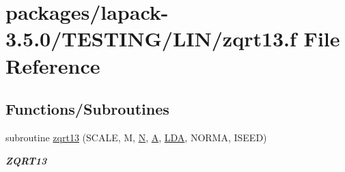 \hypertarget{zqrt13_8f}{}\section{packages/lapack-\/3.5.0/\+T\+E\+S\+T\+I\+N\+G/\+L\+I\+N/zqrt13.f File Reference}
\label{zqrt13_8f}
\subsection*{Functions/\+Subroutines}
\begin{DoxyCompactItemize}
\item 
subroutine \hyperlink{group__complex16__lin_ga951addfdb4cc63d6a52f018e7f86475a}{zqrt13} (S\+C\+A\+L\+E, M, \hyperlink{polmisc_8c_a0240ac851181b84ac374872dc5434ee4}{N}, \hyperlink{classA}{A}, \hyperlink{example__user_8c_ae946da542ce0db94dced19b2ecefd1aa}{L\+D\+A}, N\+O\+R\+M\+A, I\+S\+E\+E\+D)
\begin{DoxyCompactList}\small\item\em {\bfseries Z\+Q\+R\+T13} \end{DoxyCompactList}\end{DoxyCompactItemize}
